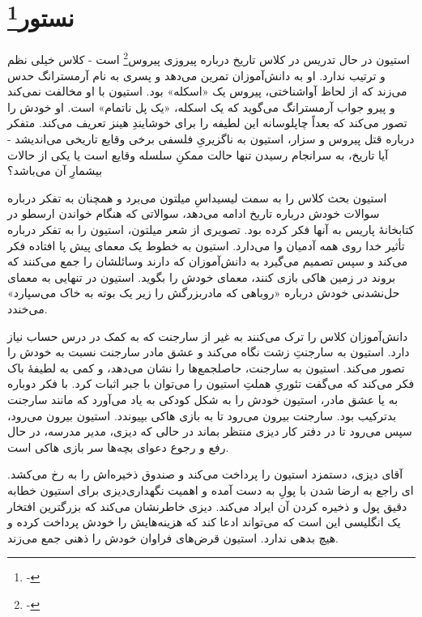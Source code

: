 \documentclass[12pt]{book}
\begin{document}
    \chapter[نستور]{نستور\protect\footnote{-}}\label{ep:2}
    استیون در حال تدریس در کلاس تاریخ درباره پیروزی پیروس\footnote{-} است - کلاس خیلی نظم و ترتیب ندارد. او به دانش‌آموزان تمرین می‌دهد و پسری به نام آرمسترانگ حدس می‌زند که از لحاظ آواشناختی، پیروس یک «اسکله» بود. استیون با او مخالفت نمی‌کند و پیرو جواب آرمسترانگ می‌گوید که یک اسکله، «یک پل ناتمام» است. او خودش را تصور می‌کند که بعداً چاپلوسانه این لطیفه را برای خوشایندِ هینز تعریف می‌کند. متفکر درباره قتل پیروس و سزار، استیون به ناگزیریِ فلسفی برخی وقایع تاریخی می‌اندیشد - آیا تاریخ، به سرانجام رسیدن تنها حالت ممکنِ سلسله وقایع است یا یکی از حالات بیشمارِ آن می‌باشد؟

    استیون بحث کلاس را به سمت لیسیداسِ میلتون می‌برد و همچنان به تفکر درباره سوالات خودش درباره تاریخ ادامه می‌دهد، سوالاتی که هنگام خواندن ارسطو در کتابخانۀ پاریس به آنها فکر کرده بود. تصویری از شعر میلتون، استیون را به تفکر درباره تأثیر خدا روی همه آدمیان وا می‌دارد. استیون به خطوط یک معمای پیش پا افتاده فکر می‌کند و سپس تصمیم می‌گیرد به دانش‌آموزان که دارند وسائلشان را جمع می‌کنند که بروند در زمین هاکی بازی کنند، معمای خودش را بگوید. استیون در تنهایی به معمای حل‌نشدنی خودش درباره «روباهی که مادربزرگش را زیر یک بوته به خاک می‌سپارد» می‌خندد.

    دانش‌آموزان کلاس را ترک می‌کنند به غیر از سارجنت که به کمک در درس حساب نیاز دارد. استیون به سارجنتِ زشت نگاه می‌کند و عشق مادر سارجنت نسبت به خودش را تصور می‌کند. استیون به سارجنت، حاصلجمع‌ها را نشان می‌دهد، و کمی به لطیفۀ باک فکر می‌کند که می‌گفت تئوریِ هملتِ استیون را می‌توان با جبر اثبات کرد. با فکر دوباره به  یا عشق مادر، استیون خودش را به شکل کودکی به یاد می‌آورد که مانند سارجنت بدترکیب بود. سارجنت بیرون می‌رود تا به بازی هاکی بپیوندد. استیون بیرون می‌رود، سپس می‌رود تا در دفتر کار دیزی منتظر بماند در حالی که دیزی، مدیر مدرسه، در حال رفع و رجوع دعوای بچه‌ها سر بازی هاکی است.

    آقای دیزی، دستمزد استیون را پرداخت می‌کند و صندوق ذخیره‌اش را به رخ می‌کشد. دیزی برای استیون خطابه‎‌ای راجع به ارضا شدن با پولِ به دست آمده و اهمیت نگهداری دقیق پول و ذخیره کردن آن ایراد می‌کند. دیزی خاطرنشان می‌کند که بزرگترین افتخار یک انگلیسی این است که می‌تواند ادعا کند که هزینه‌هایش را خودش پرداخت کرده و هیچ بدهی ندارد. استیون قرض‌های فراوان خودش را ذهنی جمع می‌زند.
\end{document}
